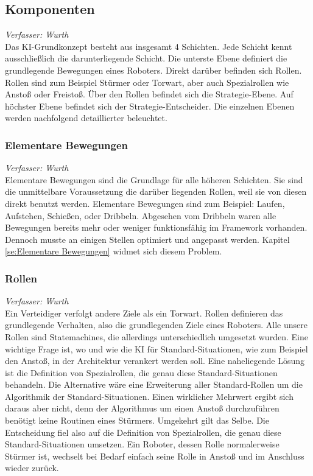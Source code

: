 \documentclass[fontsize=12pt,a4paper,final]{scrartcl}[2003/01/01]
\begin{document}
\subsection{Komponenten}
\textit{Verfasser: Wurth}\\

Das KI-Grundkonzept besteht aus insgesamt 4 Schichten. Jede Schicht kennt ausschließlich die darunterliegende Schicht. Die unterste Ebene definiert die grundlegende Bewegungen eines Roboters. Direkt darüber befinden sich Rollen. Rollen sind zum Beispiel \glqq Stürmer\grqq{} oder \glqq Torwart\grqq, aber auch Spezialrollen wie \glqq Anstoß\grqq{} oder \glqq Freistoß\grqq. Über den Rollen befindet sich die Strategie-Ebene. Auf höchster Ebene befindet sich der Strategie-Entscheider. Die einzelnen Ebenen werden nachfolgend detaillierter beleuchtet.

\subsubsection{Elementare Bewegungen}
\textit{Verfasser: Wurth}\\

Elementare Bewegungen sind die Grundlage für alle höheren Schichten. Sie sind die unmittelbare Voraussetzung die darüber liegenden Rollen, weil sie von diesen direkt benutzt werden. Elementare Bewegungen sind zum Beispiel: \glqq Laufen\grqq, \glqq Aufstehen\grqq, \glqq Schießen\grqq, oder \glqq Dribbeln\grqq. Abgesehen vom \glqq Dribbeln\grqq{} waren alle Bewegungen bereits mehr oder weniger funktionsfähig im Framework vorhanden. Dennoch musste an einigen Stellen optimiert und angepasst werden. Kapitel \ref{se:Elementare Bewegungen} widmet sich diesem Problem.

\subsubsection{Rollen}\label{Rollen Konzept}
\textit{Verfasser: Wurth}\\

Ein Verteidiger verfolgt andere Ziele als ein Torwart. Rollen definieren das grundlegende Verhalten, also die grundlegenden Ziele eines Roboters. Alle unsere Rollen sind Statemachines, die allerdings unterschiedlich umgesetzt wurden. Eine wichtige Frage ist, wo und wie die KI für Standard-Situationen, wie zum Beispiel den \glqq Anstoß\grqq, in der Architektur verankert werden soll. Eine naheliegende Lösung ist die Definition von Spezialrollen, die genau diese Standard-Situationen behandeln. Die Alternative wäre eine Erweiterung aller Standard-Rollen um die Algorithmik der Standard-Situationen. Einen wirklicher Mehrwert ergibt sich daraus aber nicht, denn der Algorithmus um einen Anstoß durchzuführen benötigt keine Routinen eines Stürmers. Umgekehrt gilt das Selbe. Die Entscheidung fiel also auf die Definition von Spezialrollen, die genau diese Standard-Situationen umsetzen. Ein Roboter, dessen Rolle normalerweise Stürmer ist, wechselt bei Bedarf einfach seine Rolle in \glqq Anstoß\grqq{} und im Anschluss wieder zurück.
\end{document}
